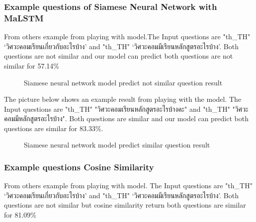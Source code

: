 \documentclass[12pt,oneside,openright,a4paper]{cpe-english-project}
\begin{document}
\subsubsection{Example questions of Siamese Neural Network with MaLSTM}
\label{example_siamese_compare}
From others example from playing with model.The Input questions are
{
\XeTeXlinebreaklocale "th_TH"	
\thaifont 
 ‘วิศวะคอมเรียนเกี่ยวกับอะไรบ้าง’ }and 
{
\XeTeXlinebreaklocale "th_TH"	
\thaifont ‘วิศวะคอมมีเรียนหลักสูตรอะไรบ้าง’.}
 Both questions are not similar and our model can predict both questions are not similar for 57.14\%
\begin{figure}[!h]\centering
{}
\caption{Siamese neural network model predict not similar question result}\label{fig:Model result by compare questions which not similar}
\end{figure}

The picture below shows an example result from playing with the model. The Input questions are
{
\XeTeXlinebreaklocale "th_TH"	
\thaifont 
"วิศวะคอมเรียนหลักสูตรอะไรบ้างคะ"}
and
{
\XeTeXlinebreaklocale "th_TH"	
\thaifont 
"วิศวะคอมมีหลักสูตรอะไรบ้าง". 
}Both questions are similar and our model can predict both questions are similar for 83.33\%.
\begin{figure}[!h]\centering
{}
\caption{Siamese neural network model predict similar question result}\label{fig:Model result by compare questions which similar}
\end{figure}



\subsubsection{Example questions Cosine Similarity}
\label{example_cosine_compare}
From others example from playing with model. The Input questions are
{
\XeTeXlinebreaklocale "th_TH"	
\thaifont 
 ‘วิศวะคอมเรียนเกี่ยวกับอะไรบ้าง’ }and 
{
\XeTeXlinebreaklocale "th_TH"	
\thaifont ‘วิศวะคอมมีเรียนหลักสูตรอะไรบ้าง’.}
 Both questions are not similar but cosine similarity return both questions are similar for 81.09\%
\end{document}
